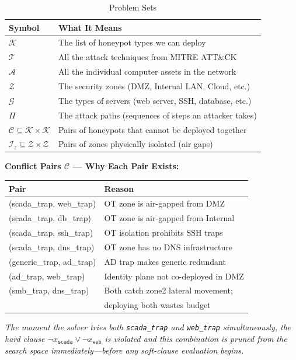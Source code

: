 \documentclass[journal]{IEEEtran}
\newcommand{\calK}{\mathcal{K}}
\newcommand{\calT}{\mathcal{T}}
\newcommand{\calA}{\mathcal{A}}
\newcommand{\calZ}{\mathcal{Z}}
\newcommand{\calG}{\mathcal{G}}
\newcommand{\calC}{\mathcal{C}}
\newcommand{\calPi}{\mathcal{\Pi}}
\begin{document}
\begin{table}[htbp]
\caption{Problem Sets}
\label{tab:sets}
\centering
\renewcommand{\arraystretch}{1.2}
\begin{tabular}{@{}ll@{}}
\toprule
\textbf{Symbol} & \textbf{What It Means} \\
\midrule
$\calK$ & The list of honeypot types we can deploy \\
$\calT$ & All the attack techniques from MITRE ATT\&CK \\
$\calA$ & All the individual computer assets in the network \\
$\calZ$ & The security zones (DMZ, Internal LAN, Cloud, etc.) \\
$\calG$ & The types of servers (web server, SSH, database, etc.) \\
$\calPi$ & The attack paths (sequences of steps an attacker takes) \\
$\calC \subseteq \calK \times \calK$ & Pairs of honeypots that cannot be deployed together \\
$\mathcal{I}_z \subseteq \calZ \times \calZ$ & Pairs of zones physically isolated (air gaps) \\
\bottomrule
\end{tabular}
\end{table}

\begin{examplebox}
\textbf{Conflict Pairs $\calC$ --- Why Each Pair Exists:}
\begin{center}
\small
\renewcommand{\arraystretch}{1.1}
\begin{tabular}{@{}ll@{}}
\toprule
\textbf{Pair} & \textbf{Reason} \\
\midrule
(scada\_trap, web\_trap)  & OT zone is air-gapped from DMZ \\
(scada\_trap, db\_trap)   & OT zone is air-gapped from Internal \\
(scada\_trap, ssh\_trap)  & OT isolation prohibits SSH traps \\
(scada\_trap, dns\_trap)  & OT zone has no DNS infrastructure \\
(generic\_trap, ad\_trap) & AD trap makes generic redundant \\
(ad\_trap, web\_trap)     & Identity plane not co-deployed in DMZ \\
(smb\_trap, dns\_trap)    & Both catch zone2 lateral movement;\\
                          & deploying both wastes budget \\
\bottomrule
\end{tabular}
\end{center}
\textit{The moment the solver tries both
\texttt{scada\_trap} and \texttt{web\_trap} simultaneously,
the hard clause $\neg x_{\texttt{scada}} \vee
\neg x_{\texttt{web}}$ is violated and this combination
is pruned from the search space immediately---before any
soft-clause evaluation begins.}
\end{examplebox}
\end{document}
